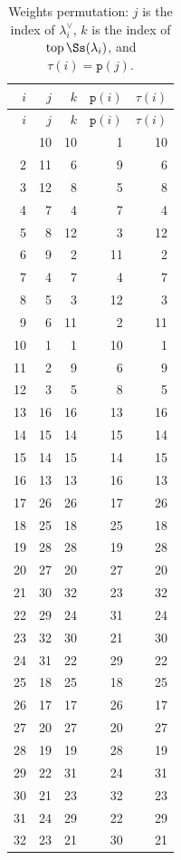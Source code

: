 \begin{longtable}{rrrrr}
\caption{Weights permutation: $j$ is the index of $\lambda_i^\vee$, $k$ is the index of $\operatorname{top}\Ss(\lambda_i)$, and $\tau(i)=\mathtt{p}(j)$.}\label{tab:weights_permutation}\\
\hline
$i$ & $j$ & $k$ & $\mathtt{p}(i)$ & $\tau(i)$\\
\hline
\endfirsthead
\hline
$i$ & $j$ & $k$ & $\mathtt{p}(i)$ & $\tau(i)$\\
\hline
\endhead
\hline
\endlastfoot
1 & 10 & 10 & 1 & 10 \\
2 & 11 & 6 & 9 & 6 \\
3 & 12 & 8 & 5 & 8 \\
4 & 7 & 4 & 7 & 4 \\
5 & 8 & 12 & 3 & 12 \\
6 & 9 & 2 & 11 & 2 \\
7 & 4 & 7 & 4 & 7 \\
8 & 5 & 3 & 12 & 3 \\
9 & 6 & 11 & 2 & 11 \\
10 & 1 & 1 & 10 & 1 \\
11 & 2 & 9 & 6 & 9 \\
12 & 3 & 5 & 8 & 5 \\
13 & 16 & 16 & 13 & 16 \\
14 & 15 & 14 & 15 & 14 \\
15 & 14 & 15 & 14 & 15 \\
16 & 13 & 13 & 16 & 13 \\
17 & 26 & 26 & 17 & 26 \\
18 & 25 & 18 & 25 & 18 \\
19 & 28 & 28 & 19 & 28 \\
20 & 27 & 20 & 27 & 20 \\
21 & 30 & 32 & 23 & 32 \\
22 & 29 & 24 & 31 & 24 \\
23 & 32 & 30 & 21 & 30 \\
24 & 31 & 22 & 29 & 22 \\
25 & 18 & 25 & 18 & 25 \\
26 & 17 & 17 & 26 & 17 \\
27 & 20 & 27 & 20 & 27 \\
28 & 19 & 19 & 28 & 19 \\
29 & 22 & 31 & 24 & 31 \\
30 & 21 & 23 & 32 & 23 \\
31 & 24 & 29 & 22 & 29 \\
32 & 23 & 21 & 30 & 21 \\

\end{longtable}
